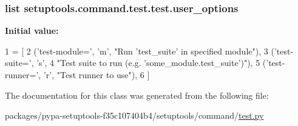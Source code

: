 \subsubsection[{user\+\_\+options}]{\setlength{\rightskip}{0pt plus 5cm}list setuptools.\+command.\+test.\+test.\+user\+\_\+options\hspace{0.3cm}{\ttfamily [static]}}\label{classsetuptools_1_1command_1_1test_1_1test_aeb8bd2b55d94c76e676d8dbde763fcd8}
{\bfseries Initial value\+:}
\begin{DoxyCode}
1 = [
2         (\textcolor{stringliteral}{'test-module='}, \textcolor{stringliteral}{'m'}, \textcolor{stringliteral}{"Run 'test\_suite' in specified module"}),
3         (\textcolor{stringliteral}{'test-suite='}, \textcolor{stringliteral}{'s'},
4          \textcolor{stringliteral}{"Test suite to run (e.g. 'some\_module.test\_suite')"}),
5         (\textcolor{stringliteral}{'test-runner='}, \textcolor{stringliteral}{'}\textcolor{stringliteral}{r', "Test runner to use"),}
6 \textcolor{stringliteral}{    ]}
\end{DoxyCode}


The documentation for this class was generated from the following file\+:\begin{DoxyCompactItemize}
\item 
packages/pypa-\/setuptools-\/f35c107404b4/setuptools/command/\hyperlink{pypa-setuptools-f35c107404b4_2setuptools_2command_2test_8py}{test.\+py}\end{DoxyCompactItemize}
